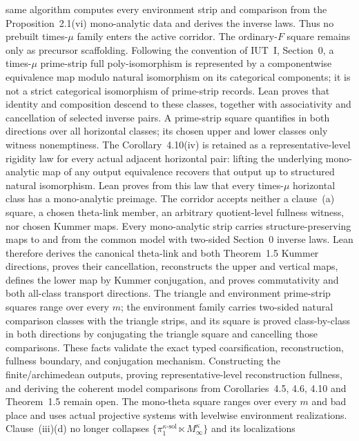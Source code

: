 \begin{definition}
  same algorithm computes every environment strip and comparison from the
  Proposition~2.1(vi) mono-analytic data and derives the inverse laws.  Thus no
  prebuilt times-\(\mu\) family enters the active corridor.  The ordinary-\(F\)
  square remains only as precursor scaffolding.  Following the convention of
  IUT~I, Section~0, a
  times-\(\mu\) prime-strip full
  poly-isomorphism is represented by a componentwise
  equivalence map modulo natural isomorphism on its categorical components;
  it is not a strict categorical isomorphism of prime-strip records.  Lean
  proves that identity and composition descend to these classes, together
  with associativity and cancellation of selected inverse pairs.  A
  prime-strip square quantifies in both directions over all horizontal
  classes; its chosen upper and lower classes only witness nonemptiness.  The
  Corollary~4.10(iv) is retained as a representative-level rigidity law for
  every actual adjacent horizontal pair: lifting the underlying mono-analytic map of any output
  equivalence recovers that output up to structured natural isomorphism.  Lean
  proves from this law that every times-\(\mu\) horizontal class has a
  mono-analytic preimage.  The corridor accepts neither a clause~(a) square,
  a chosen theta-link member, an arbitrary quotient-level fullness witness,
  nor chosen Kummer maps.  Every mono-analytic strip carries structure-preserving maps to
  and from the common model with two-sided Section~0 inverse laws.  Lean
  therefore derives the canonical theta-link and both Theorem~1.5 Kummer
  directions, proves their cancellation, reconstructs the upper and vertical maps, defines the
  lower map by Kummer conjugation, and proves commutativity and both
  all-class transport directions.  The triangle
  and environment prime-strip squares range over every \(m\); the environment
  family carries two-sided natural comparison classes with the triangle
  strips, and its square is proved class-by-class in both directions by
  conjugating the triangle square and cancelling those comparisons.  These
  facts validate the exact typed coarsification, reconstruction, fullness
  boundary, and conjugation mechanism.  Constructing the finite/archimedean
  outputs, proving representative-level reconstruction fullness, and deriving
  the coherent model comparisons from Corollaries~4.5, 4.6, 4.10 and
  Theorem~1.5 remain open.  The
  mono-theta square ranges over every \(m\) and bad
  place and uses actual projective systems with levelwise environment
  realizations.  Clause~(iii)(d) no longer collapses
  \(\{\pi_1^{\kappa\text{-sol}}\ltimes M_\infty^\kappa\}\) and its localizations

\end{definition}
